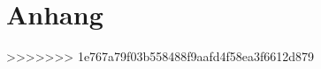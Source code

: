 %














%
%




% 
%
\seAppendix{}
\chapter{Anhang}


% 
% 
% 
% 
% 
% 
% 
% 
% 
% 
% 
% 
% 

%
%
%
%


%
%
\newpage
\sePrintBibliography{}

% 


%
%


%
%
%


%
%
%














>>>>>>> 1e767a79f03b558488f9aafd4f58ea3f6612d879

